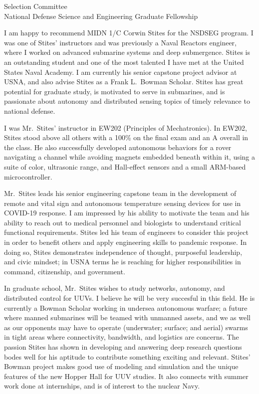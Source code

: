 \documentclass[10pt]{wrceletter}
\date{\today}
\begin{document}
\begin{letter}{%
Selection Committee\\
National Defense Science and Engineering Graduate Fellowship}

\opening{}
\raggedright %
\setlength{\parindent}{15pt} %
I am happy to recommend MIDN 1/C Corwin Stites for the NSDSEG program. I was one of Stites' instructors and was previously a Naval Reactors engineer, where I worked on advanced submarine systems and deep submergence. Stites is an outstanding student and one of the most talented I have met at the United States Naval Academy. I am currently his senior capstone project advisor at USNA, and also advise Stites as a Frank L.~Bowman Scholar.  Stites has great potential for graduate study, is motivated to serve in submarines, and is passionate about autonomy and distributed sensing topics of timely relevance to national defense.  

I was Mr.~Stites' instructor in EW202 (Principles of Mechatronics).  In EW202, Stites stood above all others with a 100\% on the final exam and an A overall in the class. He also successfully developed autonomous behaviors for a rover navigating a channel while avoiding magnets embedded beneath within it, using a suite of color, ultrasonic range, and Hall-effect sensors and a small ARM-based microcontroller. 

Mr.~Stites leads his senior engineering capstone team in the development of remote and vital sign and autonomous temperature sensing devices for use in COVID-19 response. I am impressed by his ability to motivate the team and his ability to reach out to medical personnel and biologists to understand critical functional requirements. Stites led his team of engineers to consider this project in order to benefit others and apply engineering skills to pandemic response. In doing so, Stites demonstrates independence of thought, purposeful leadership, and civic mindset; in USNA terms he is reaching for higher responsibilities in command, citizenship, and government.

In graduate school, Mr.~Stites wishes to study networks, autonomy, and distributed control for UUVs. I believe he will be very succesful in this field. He is currently a Bowman Scholar working in undersea autonomous warfare; a future where manned submarines will be teamed with unmanned assets, and we as well as our opponents may have to operate (underwater; surface; and aerial) swarms in tight areas where connectivity, bandwidth, and logistics are concerns. The passion Stites has shown in developing and answering deep research questions bodes well for his aptitude to contribute something exciting and relevant. Stites' Bowman project makes good use of modeling and simulation and the unique features of the new Hopper Hall for UUV studies. It also connects with summer work done at internships, and is of interest to the nuclear Navy.  


\end{letter}
\end{document}
